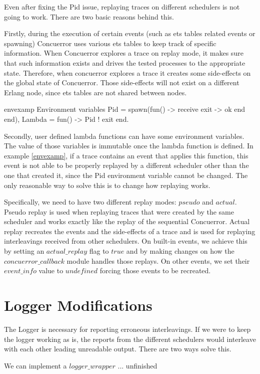 Even after fixing the Pid issue, replaying traces on different schedulers is not going to work. There are two basic reasons behind this. 

Firstly, during the execution of certain events (such as ets tables related events or spawning) Concuerror uses various ets 
tables to keep track of specific information. When Concuerror explores a trace on replay mode, it makes sure that such
 information exists and drives the tested processes to the appropriate state. Therefore, when concuerror explores a
 trace it creates some side-effects on the global state of Concuerror. Those side-effects will not exist on
 a different Erlang node, since ets tables are not shared between nodes. 

\begin{code}{envexamp}{ Environment variables}
    Pid = spawn(fun() -> 
                    receive
                        exit ->
                            ok 
                    end
                end),
    Lambda =
        fun() ->
             Pid ! exit
        end.
\end{code}

Secondly, user defined lambda functions can have some environment variables. The value of those variables is
immutable once the lambda function is defined. In example \ref{envexamp}, if a trace contains an event
that applies this function, this event is not able to be properly replayed by a different scheduler other than the one that
created it, since the Pid environment variable cannot be changed. The only reasonable way to solve this is to
change how replaying works.

Specifically, we need to have two different replay modes: $pseudo$ and $actual$. Pseudo replay is used when
replaying traces that were created by the same scheduler and works exactly like the replay of the sequential
Concuerror. Actual replay recreates the events and the side-effects of a trace and is used for
replaying interleavings received from other schedulers. On built-in events, we achieve this by setting an
$actual\_replay$ flag to $true$ and by making changes on how the $concuerror\_callback$ module handles those replays.
On other events, we set their $event\_info$ value to $undefined$ forcing those events to be recreated.

\section{Logger Modifications}

The Logger is necessary for reporting erroneous interleavings. If we were to keep the logger working as is,
the reports from the different schedulers would interleave with each other leading unreadable output. There are two ways
solve this.

We can implement a $logger\_wrapper$ ... unfinished